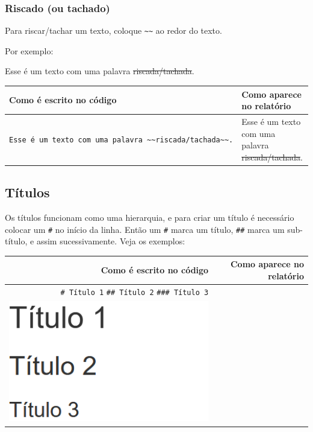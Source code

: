 \documentclass[
]{book}
\begin{document}
\hypertarget{riscado-ou-tachado}{%
\subsubsection*{Riscado (ou tachado)}\label{riscado-ou-tachado}}

Para riscar/tachar um texto, coloque \texttt{\textasciitilde{}\textasciitilde{}} ao redor do texto.

Por exemplo:

Esse é um texto com uma palavra \sout{riscada/tachada}.

\begin{longtable}[]{@{}
  >{\raggedleft\arraybackslash}p{}
  >{\raggedleft\arraybackslash}p{}@{}}
\toprule
Como é escrito no código & Como aparece no relatório \\
\midrule
\endhead
\texttt{Esse\ é\ um\ texto\ com\ uma\ palavra\ \textasciitilde{}\textasciitilde{}riscada/tachada\textasciitilde{}\textasciitilde{}.} & Esse é um texto com uma palavra \sout{riscada/tachada}. \\
\bottomrule
\end{longtable}

\hypertarget{tuxedtulos}{%
\subsection{Títulos}\label{tuxedtulos}}

Os títulos funcionam como uma hierarquia, e para criar um título é necessário colocar um \texttt{\#} no início da linha. Então um \texttt{\#} marca um título, \texttt{\#\#} marca um sub-título, e assim sucessivamente. Veja os exemplos:

\begin{longtable}[]{@{}rr@{}}
\toprule
Como é escrito no código & Como aparece no relatório \\
\midrule
\endhead
\texttt{\#\ Título\ 1} \texttt{\#\#\ Título\ 2} \texttt{\#\#\#\ Título\ 3} & \\
\includegraphics[width=4.72in]{assets/img/relatorios/titulos} & \\
\bottomrule
\end{longtable}
\end{document}
